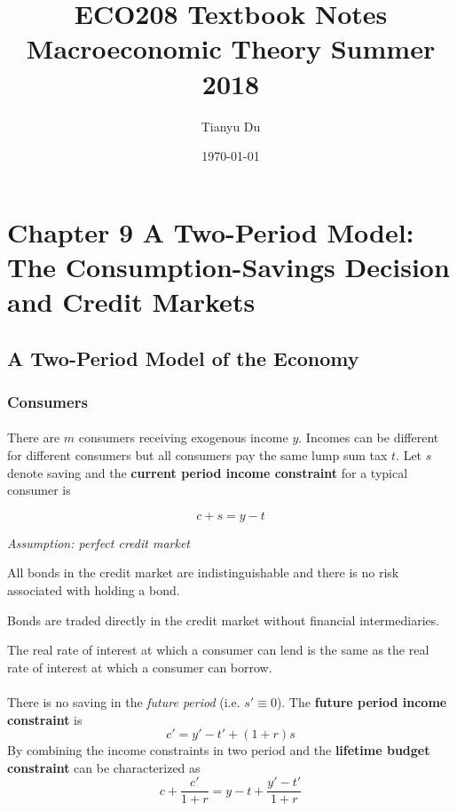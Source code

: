 \documentclass[11pt]{article}
\title{ECO208 Textbook Notes \\ \small Macroeconomic Theory Summer 2018 }
\author{Tianyu Du}
\date{\today}
\begin{document}
	\maketitle
	\tableofcontents
	
	\section{Chapter 9 A Two-Period Model: \\ The Consumption-Savings Decision and Credit Markets}
	
	\subsection{A Two-Period Model of the Economy}
	
	\subsubsection{Consumers}
	
	\paragraph{} There are $m$ consumers receiving exogenous income $y$. Incomes can be different for different consumers but all consumers pay the same lump sum tax $t$. Let $s$ denote saving and the \textbf{current period income constraint} for a typical consumer is
	
	\begin{equation}
		c + s = y - t
	\end{equation}
	
	\emph{Assumption: perfect credit market}
	\begin{assumption}
		All bonds in the credit market are indistinguishable and there is no risk associated with holding a bond.
	\end{assumption}
	\begin{assumption}
		Bonds are traded directly in the credit market without financial intermediaries.
	\end{assumption}
	\begin{assumption}
		The real rate of interest at which a consumer can lend is the same as the real rate of interest at which a consumer can borrow.
	\end{assumption}
	
	\paragraph{} There is no saving in the \emph{future period} (i.e. $s' \equiv 0$). The \textbf{future period income constraint} is 
	\begin{equation}
		c' = y' - t' + (1 + r)s
	\end{equation}
	By combining the income constraints in two period and the \textbf{lifetime budget constraint} can be characterized as 
	\begin{equation}
		c + \frac{c'}{1+r} = y - t + \frac{y' - t'}{1 + r}
	\end{equation}
	
\end{document}

